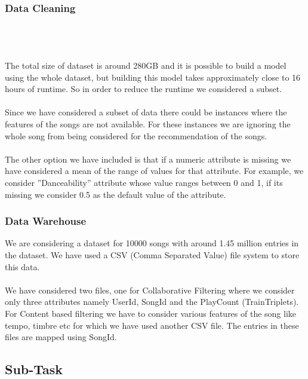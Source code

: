 \documentclass{sig-alternate-05-2015}
\begin{document}
\subsubsection {Data Cleaning}\\\\\\
The total size of dataset is around 280GB and it is possible to build a model using the whole dataset, but building this model takes approximately close to 16 hours of runtime. So in order to reduce the runtime we considered a subset.\\\\
Since we have considered a subset of data there could be instances where the features of the songs are not available. For these instances we are ignoring the whole song from being considered for the recommendation of the songs.\\\\
The other option we have included is that if a numeric attribute is missing we have considered a mean of the range of values for that attribute. For example, we consider ''Danceability'' attribute whose value ranges between 0 and 1, if its missing we consider 0.5 as the default value of the attribute.\\
\subsubsection {Data Warehouse}
We are considering a dataset for 10000 songs with around 1.45 million entries in the dataset. We have used a CSV (Comma Separated Value) file system to store this data.\\\\ We have considered two files, one for Collaborative Filtering where we consider only three attributes namely UserId, SongId and the PlayCount (TrainTriplets). For Content based filtering we have to consider various features of the song like tempo, timbre etc for which we have used another CSV file. The entries in these files are mapped using SongId.
\newpage
\subsection{Sub-Task}
\end{document}
